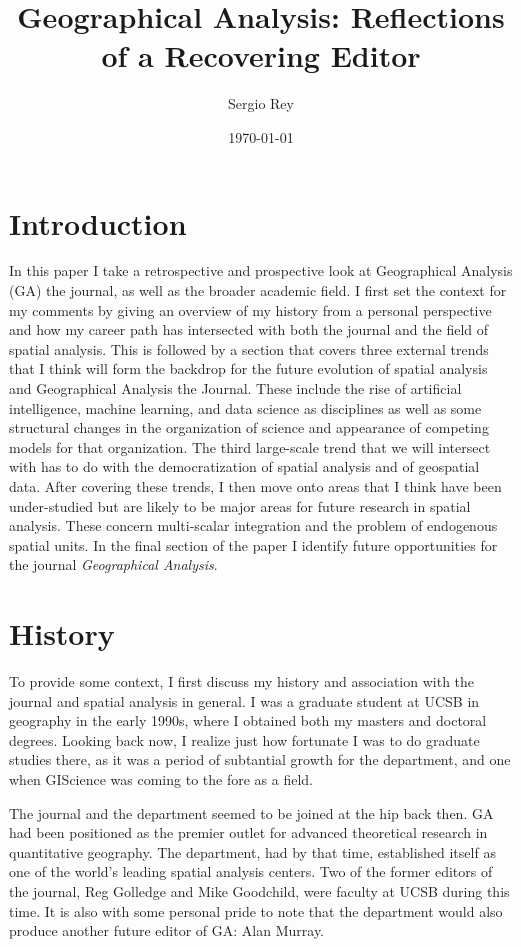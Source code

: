 \documentclass[11pt]{article}
\author{Sergio Rey}
\date{\today}
\title{Geographical Analysis: Reflections of a Recovering Editor}
\begin{document}
\maketitle

\section{Introduction}
\label{sec:org79c12a3}

In this paper I take a retrospective and prospective look at 
Geographical Analysis (GA) the journal, as well as  the broader academic
field. I first set the context for my comments by giving an overview of my
history from a personal perspective and how my career path has intersected with
both the journal and the field of spatial analysis. This is followed by a
section that covers three external trends that I think will form the backdrop
for the future evolution of spatial analysis and Geographical Analysis the
Journal. These include the rise of artificial intelligence, machine learning,
and data science as disciplines as well as some structural changes in the
organization of science and appearance of competing models for that
organization. The third large-scale trend that we will intersect with has to do
with the democratization of spatial analysis and of geospatial data. After
covering these trends, I then move onto areas that I think have been
under-studied but are likely to be major areas for future research in spatial
analysis. These concern multi-scalar integration and the problem of endogenous
spatial units. In the final section of the paper I identify future opportunities
for the journal \emph{Geographical Analysis}.

\section{History}
\label{sec:orgfb43d5b}
To provide some context, I first discuss my history and association with the
journal and spatial analysis in general. I was a graduate student at UCSB in
geography in the early 1990s, where I obtained both my masters and doctoral
degrees. Looking back now, I realize just how fortunate I was to do graduate studies
there, as it was a period of subtantial growth for the department, and one when
GIScience was coming to the fore as a field.

The journal and the department seemed to be joined at the hip back then. GA had
been positioned as the premier outlet for advanced theoretical research in
quantitative geography. The department, had by that time, established itself as
one of the world's leading spatial analysis centers. Two of the former editors
of the journal, Reg Golledge and Mike Goodchild, were faculty at UCSB during
this time. It is also with some personal pride to note that the department would
also produce another future editor of GA: Alan Murray.
\end{document}
